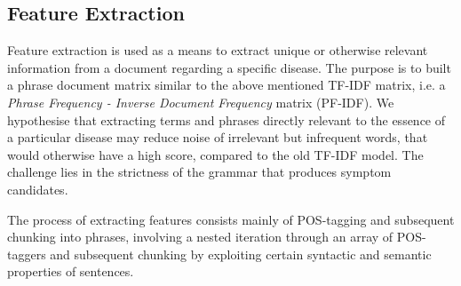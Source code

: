 \documentclass[10pt,letterpaper,final]{article}
\begin{document}
\subsection{Feature Extraction}
Feature extraction is used as a means to extract unique or otherwise
relevant information from a document regarding a specific disease. The
purpose is to built a phrase document matrix similar to the above
mentioned TF-IDF matrix, i.e. a \textit{Phrase Frequency - Inverse
Document Frequency} matrix (PF-IDF). We hypothesise that extracting
terms and phrases directly relevant to the essence of a particular
disease may reduce noise of irrelevant but infrequent words, that would
otherwise have a high score, compared to the old TF-IDF model. The
challenge lies in the strictness of the grammar that produces symptom
candidates.

The process of extracting features consists mainly of POS-tagging and
subsequent chunking into phrases, involving a nested iteration through
an array of POS-taggers and subsequent chunking by exploiting certain
syntactic and semantic properties of sentences.
\end{document}
